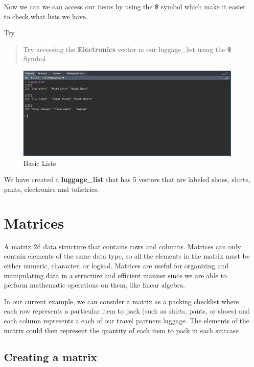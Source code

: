 \documentclass[
]{book}
\begin{document}
Now we can we can access our items by using the \textbf{\$} symbol which make it easier to check what lists we have.

Try

\begin{quote}
Try accessing the \textbf{Electronics} vector in our luggage\_list using the \textbf{\$} Symbol.
\end{quote}

\begin{figure}
\includegraphics[width=29.36in]{images/3.6listconsole} \caption{Basic Lists}\label{fig:unnamed-chunk-18}
\end{figure}

We have created a \textbf{luggage\_list} that has 5 vectors that are labeled shoes, shirts, pants, electronics and tolietries.

\hypertarget{matrices}{%
\section{Matrices}\label{matrices}}

A matrix 2d data structure that contains rows and columns. Matrices can only contain elements of the same data type, so all the elements in the matrix must be either numeric, character, or logical. Matrices are useful for organizing and manipulating data in a structure and efficient manner since we are able to perform mathematic operations on them, like linear algebra.

In our current example, we can consider a matrix as a packing checklist where each row represents a particular item to pack (such as shirts, pants, or shoes) and each column represents a each of our travel partners luggage. The elements of the matrix could then represent the quantity of each item to pack in each suitcase

\hypertarget{creating-a-matrix}{%
\subsection{Creating a matrix}\label{creating-a-matrix}}
\end{document}
